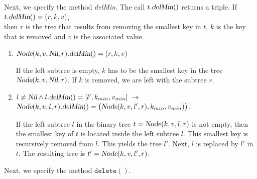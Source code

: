 Next, we specify the  method \textsl{delMin}.  The call $t.\textsl{delMin}()$ returns a triple.
If 
\\[0.2cm]
\hspace*{1.3cm}
$t.\textsl{delMin}() = (r,k,v)$,
\\[0.2cm]
then $r$ is the tree that  results from
removing the smallest key in $t$, $k$ is the key that is removed and $v$ is the associated value.
\begin{enumerate}
\item $\textsl{Node}(k, v, \textsl{Nil}, r).\textsl{delMin}() = (r, k, v)$

      If the left subtree is empty, $k$ has to be the smallest key in the tree 
      $\textsl{Node}(k, v, \textsl{Nil}, r)$.  If $k$ is removed, we are left with the subtree $r$.
\item $l\not= \textsl{Nil} \wedge l.\textsl{delMin}() = [l',k_{min}, v_{min}] \;\rightarrow$ \\[0.2cm]
       \hspace*{1.3cm} 
       $\textsl{Node}(k, v, l, r).\textsl{delMin}() = \bigl(\textsl{Node}(k, v, l', r), k_{min}, v_{min})\bigr)$.

      If the left subtree $l$ in the binary tree $t = \textsl{Node}(k, v, l, r)$
      is not empty, then the smallest key of  $t$ is located inside the left subtree $l$.
      This smallest key is recursively removed from  $l$. This yields the tree 
      $l'$.  Next,  $l$ is replaced by $l'$ in $t$.  The resulting tree is
      $t' = \textsl{Node}(k, v, l', r)$.
\end{enumerate}
Next, we specify the method $\mathtt{delete}()$.
